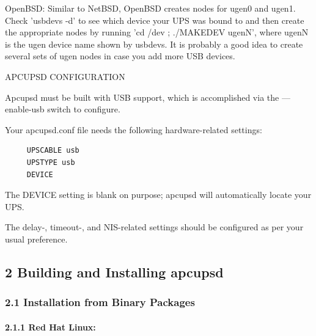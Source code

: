 OpenBSD: Similar to NetBSD, OpenBSD creates nodes for ugen0 and ugen1. Check
'usbdevs -d' to see which device your UPS was bound to and then create the
appropriate nodes by running 'cd /dev ; ./MAKEDEV ugenN', where ugenN is the
ugen device name shown by usbdevs. It is probably a good idea to create
several sets of ugen nodes in case you add more USB devices.  

APCUPSD CONFIGURATION  

Apcupsd must be built with USB support, which is accomplished via the
{---}enable-usb switch to configure.  

Your apcupsd.conf file needs the following hardware-related settings: 

\footnotesize
\begin{verbatim}
     UPSCABLE usb
     UPSTYPE usb
     DEVICE
\end{verbatim}
\normalsize

The DEVICE setting is blank on purpose; apcupsd will automatically locate your
UPS.  

The delay-, timeout-, and NIS-related settings should be configured as per
your usual preference. 

\label{Building-and-Installing-apcupsd}

\subsection*{2 Building and Installing apcupsd}

\label{index-Building-18}
\label{index-Installing-19}

\label{Installation-from-Binary-Packages}

\subsubsection*{2.1 Installation from Binary Packages}

\label{Red-Hat-Linux}

\paragraph*{2.1.1 Red Hat Linux:}

